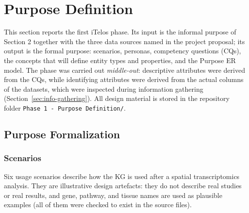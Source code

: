 \section{Purpose Definition}

This section reports the first iTelos phase. Its input is the informal purpose of Section 2 together with the three data sources named in the project proposal; its output is the formal purpose: scenarios, personas, competency questions (CQs), the concepts that will define entity types and properties, and the Purpose ER model. The phase was carried out \emph{middle-out}: descriptive attributes were derived from the CQs, while identifying attributes were derived from the actual columns of the datasets, which were inspected during information gathering (Section~\ref{sec:info-gathering}). All design material is stored in the repository folder \texttt{Phase 1 - Purpose Definition/}.

\subsection{Purpose Formalization}

\subsubsection{Scenarios}

Six usage scenarios describe how the KG is used after a spatial transcriptomics analysis. They are illustrative design artefacts: they do not describe real studies or real results, and gene, pathway, and tissue names are used as plausible examples (all of them were checked to exist in the source files).

